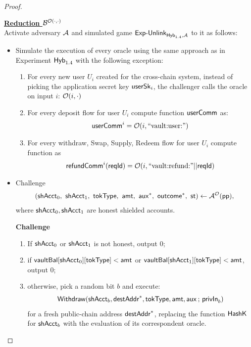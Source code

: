 \begin{proof}
\begin{tcolorbox}[
  breakable,
  colback=boxbg,
  colframe=boxrule,
  arc=2pt,                 %
  boxrule=0.8pt,           %
  top=8pt, bottom=8pt,     %
  left=10pt, right=10pt
]
\underline{\textbf{Reduction $\mathcal{B}^{\mathcal{O}(\cdot,\cdot)}$}}\\
Activate adversary $\mathcal{A}$ and simulated game $\mathsf{Exp\text{-}Unlink}_{\mathsf{Hyb}_{1.4},\mathcal{A}}$ to it as follows:
\begin{itemize}
    \item Simulate the execution of every oracle using the same approach as in Experiment $\mathsf{Hyb}_{1.4}$ with the following exception:
        \begin{enumerate}
            \item For every new user $U_i$ created for the cross-chain system, instead of picking the application secret key $\mathsf{userSk}_i$, the challenger calls the oracle on input $i$: $\mathcal{O}(i,\cdot)$
            \item For every deposit flow for user $U_i$ compute function $\mathsf{userComm}$ as:
            \begin{align*}
                & \mathsf{userComm}^{i} = \mathcal{O}(i, \text{``vault:user:''})\\
            \end{align*}
            \item For every withdraw,  Swap,  Supply, Redeem flow for user $U_i$ compute function as
            \begin{align*}
                &\mathsf{refundComm}^{i}(\mathsf{reqId}) = \mathcal{O}(i,\text{``vault:refund:''}|| \mathsf{reqId})\\
            \end{align*}
        \end{enumerate}
    \item Challenge \[(\candZero\bc \candOne\bc \tokType\bc \amt\bc \auxx^*\bc \outc^*\bc \mathsf{st}) \gets \Adv^{\mathcal{O}}(\pp),\]
      where $\mathsf{shAcct}_0, \mathsf{shAcct}_1$ are honest shielded accounts.

    \textbf{Challenge}
    \begin{enumerate}
        \item If $\mathsf{shAcct}_0$ or $\mathsf{shAcct}_1$ is not honest, output $0$;
        \item if $\mathsf{vaultBal}[\mathsf{shAcct}_0][\mathsf{tokType}] < \mathsf{amt}$ or $\mathsf{vaultBal}[\mathsf{shAcct}_1][\mathsf{tokType}] < \mathsf{amt}$, output $0$;
        \item otherwise, pick a random bit $b$ and execute:
        \[ \mathsf{Withdraw}(\mathsf{shAcct}_b, \mathsf{destAddr}^*, \mathsf{tokType}, \mathsf{amt}, \mathsf{aux} \,;\, \mathsf{privIn}_b) \]
        for a fresh public-chain address $\mathsf{destAddr}^*$, replacing the function $\mathsf{HashK}$ for $\mathsf{shAcct}_b$ with the evaluation of its correspondent oracle.
\end{enumerate}


\end{itemize}
\end{tcolorbox}
\end{proof}
